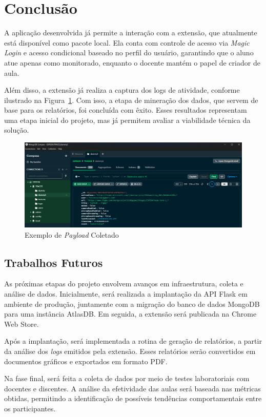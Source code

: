 \section{Conclusão}\label{sec:conclusion}
A aplicação desenvolvida já permite a interação com a extensão, que atualmente está disponível como pacote local. Ela conta com controle de acesso via \textit{Magic Login} e acesso condicional baseado no perfil do usuário, garantindo que o aluno atue apenas como monitorado, enquanto o docente mantém o papel de criador de aula.

Além disso, a extensão já realiza a captura dos logs de atividade, conforme ilustrado na Figura~\ref{fig:figura4}. Com isso, a etapa de mineração dos dados, que servem de base para os relatórios, foi concluída com êxito. Esses resultados representam uma etapa inicial do projeto, mas já permitem avaliar a viabilidade técnica da solução.

\FloatBarrier
\begin{figure}[H]
\centering
\includegraphics[width=.99\textwidth]{assets/images/resultadosv2.png}
\caption{Exemplo de \textit{Payload} Coletado}
\label{fig:figura4}
\end{figure}


\subsection{Trabalhos Futuros}\label{sub:future_endeavors}
As próximas etapas do projeto envolvem avanços em infraestrutura, coleta e análise de dados. Inicialmente, será realizada a implantação da API Flask em ambiente de produção, juntamente com a migração do banco de dados MongoDB para uma instância AtlasDB. Em seguida, a extensão será publicada na Chrome Web Store.

Após a implantação, será implementada a rotina de geração de relatórios, a partir da análise dos \textit{logs} emitidos pela extensão. Esses relatórios serão convertidos em documentos gráficos e exportados em formato PDF.

Na fase final, será feita a coleta de dados por meio de testes laboratoriais com docentes e discentes. A análise da efetividade das aulas será baseada nas métricas obtidas, permitindo a identificação de possíveis tendências comportamentais entre os participantes.

